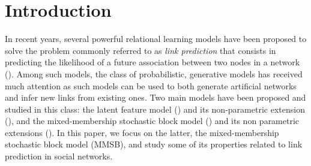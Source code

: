 \section{Introduction}
\label{sec:introduction}

In recent years, several powerful relational learning models have been proposed to solve the problem commonly referred to as \textit{link prediction} that consists in predicting the likelihood of a future association between two nodes in a network (\cite{Liben-Nowell07, HassanZaki11}). Among such models, the class of probabilistic, generative models has received much attention as such models can be used to both generate artificial networks and infer new links from existing ones. Two main models have been proposed and studied in this class: the latent feature model (\cite{BMF}) and its non-parametric extension (\cite{ILFRM}), and the mixed-membership stochastic block model (\cite{MMSB}) and its non parametric extensions (\cite{iMMSB,diMMSB}). In this paper, we focus on the latter, the mixed-membership stochastic block model (MMSB), and study some of its properties related to link prediction in social networks. 

